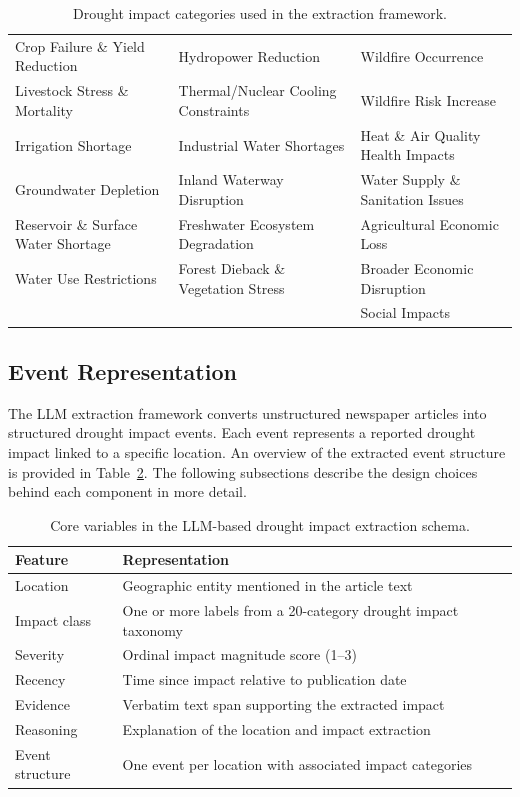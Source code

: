 \begin{table}[htbp]
\centering
\caption{Drought impact categories used in the extraction framework.}
\label{tab:impact_categories}
\footnotesize
\setlength{\tabcolsep}{3pt}
\renewcommand{\arraystretch}{1.0}
\begin{tabular}{lll}
\hline
Crop Failure \& Yield Reduction &
Hydropower Reduction &
Wildfire Occurrence \\
Livestock Stress \& Mortality &
Thermal/Nuclear Cooling Constraints &
Wildfire Risk Increase \\
Irrigation Shortage &
Industrial Water Shortages &
Heat \& Air Quality Health Impacts \\
Groundwater Depletion &
Inland Waterway Disruption &
Water Supply \& Sanitation Issues \\
Reservoir \& Surface Water Shortage &
Freshwater Ecosystem Degradation &
Agricultural Economic Loss \\
Water Use Restrictions &
Forest Dieback \& Vegetation Stress &
Broader Economic Disruption \\
&& Social Impacts \\
\hline
\end{tabular}
\end{table}


\newpage
\subsection{Event Representation}

The LLM extraction framework converts unstructured newspaper articles into structured drought impact events. Each event represents a reported drought impact linked to a specific location. An overview of the extracted event structure is provided in Table~\ref{tab:feature_schema_overview}. The following subsections describe the design choices behind each component in more detail.

\begin{table}[h!]
\centering
\renewcommand{\arraystretch}{1.2}
\begin{tabular}{ll}
\toprule
\textbf{Feature} & \textbf{Representation} \\
\midrule
Location & Geographic entity mentioned in the article text \\
Impact class & One or more labels from a 20-category drought impact taxonomy \\
Severity & Ordinal impact magnitude score (1--3) \\
Recency & Time since impact relative to publication date \\
Evidence & Verbatim text span supporting the extracted impact \\
Reasoning & Explanation of the location and impact extraction \\
Event structure & One event per location with associated impact categories \\
\bottomrule
\end{tabular}
\caption{Core variables in the LLM-based drought impact extraction schema.}
\label{tab:feature_schema_overview}
\end{table}
